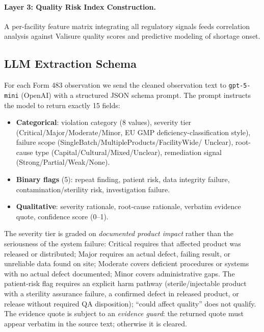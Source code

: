 \documentclass[12pt]{article}
\begin{document}
\paragraph{Layer 3: Quality Risk Index Construction.}
A per-facility feature matrix integrating all regulatory signals feeds
correlation analysis against Valisure quality scores and predictive modeling
of shortage onset.

\subsection{LLM Extraction Schema}

For each Form 483 observation we send the cleaned observation text to
\texttt{gpt-5-mini} (OpenAI) with a structured JSON schema prompt.
The prompt instructs the model to return exactly 15 fields:

\begin{itemize}[noitemsep]
  \item \textbf{Categorical}: violation category (8 values), severity tier
        (Critical/Major/Moderate/Minor, EU GMP deficiency-classification
        style), failure scope (SingleBatch/MultipleProducts/FacilityWide/%
        Unclear), root-cause type (Capital/Cultural/Mixed/Unclear),
        remediation signal (Strong/Partial/Weak/None).
  \item \textbf{Binary flags} (5): repeat finding, patient risk, data
        integrity failure, contamination/sterility risk, investigation failure.
  \item \textbf{Qualitative}: severity rationale, root-cause rationale,
        verbatim evidence quote, confidence score (0--1).
\end{itemize}

The severity tier is graded on \emph{documented product impact} rather than
the seriousness of the system failure: Critical requires that affected product
was released or distributed; Major requires an actual defect, failing result,
or unreliable data found on site; Moderate covers deficient procedures or
systems with no actual defect documented; Minor covers administrative gaps.
The patient-risk flag requires an explicit harm pathway (sterile/injectable
product with a sterility assurance failure, a confirmed defect in released
product, or release without required QA disposition); ``could affect quality''
does not qualify.
The evidence quote is subject to an \emph{evidence guard}: the returned quote
must appear verbatim in the source text; otherwise it is cleared.
\end{document}
